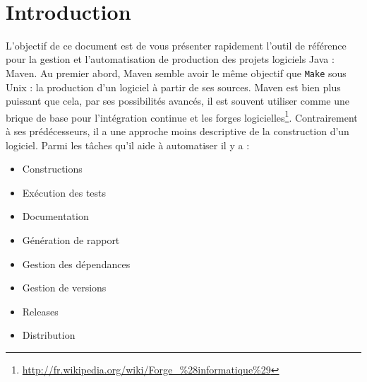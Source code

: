 \documentclass[a4paper,11pt]{article}
\date{}
\begin{document}

\newlength{\niveauZero}
\newlength{\niveauUn}
\newlength{\niveauDeux}
\newlength{\niveauTrois}
\newlength{\niveauQuatre}
\newlength{\niveauCinq}

\newlength{\colonneZero}
\newlength{\colonneUn}
\newlength{\colonneDeux}
\newlength{\colonneTrois}
\newlength{\colonneQuatre}
\newlength{\colonneCinq}


{\centering
    \mbox{
    }
}\\[0.4cm]
\section{Introduction}
L'objectif de ce document est de vous présenter rapidement l'outil de référence pour la gestion et l'automatisation 
de production des projets logiciels Java : Maven. Au premier abord, Maven semble avoir le même objectif que \texttt{Make} 
sous Unix : la production d'un logiciel à partir de ses sources. Maven est bien plus puissant que cela, par ses possibilités 
avancés, il est souvent utiliser comme une brique de base pour l'intégration continue et les forges 
logicielles\footnote{\url{http://fr.wikipedia.org/wiki/Forge_\%28informatique\%29}}. Contrairement à ses prédécesseurs, 
il a une approche moins descriptive de la construction d'un logiciel. Parmi les tâches qu'il aide à automatiser il y a :

\begin{itemize}
  \item Constructions
  \item Exécution des tests
  \item Documentation
  \item Génération de rapport
  \item Gestion des dépendances
  \item Gestion de versions
  \item Releases
  \item Distribution
\end{itemize}
\end{document}
